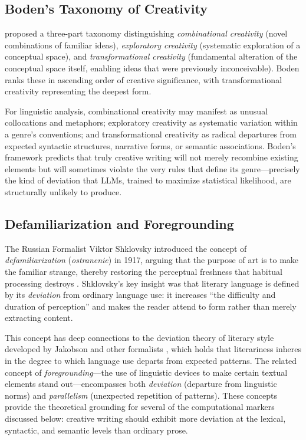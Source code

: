 \documentclass[12pt,a4paper]{article}
\begin{document}
\subsection{Boden's Taxonomy of Creativity}

\citet{boden2004creative, boden2009creativity} proposed a three-part taxonomy distinguishing \emph{combinational creativity} (novel combinations of familiar ideas), \emph{exploratory creativity} (systematic exploration of a conceptual space), and \emph{transformational creativity} (fundamental alteration of the conceptual space itself, enabling ideas that were previously inconceivable). Boden ranks these in ascending order of creative significance, with transformational creativity representing the deepest form.

For linguistic analysis, combinational creativity may manifest as unusual collocations and metaphors; exploratory creativity as systematic variation within a genre's conventions; and transformational creativity as radical departures from expected syntactic structures, narrative forms, or semantic associations. Boden's framework predicts that truly creative writing will not merely recombine existing elements but will sometimes violate the very rules that define its genre---precisely the kind of deviation that LLMs, trained to maximize statistical likelihood, are structurally unlikely to produce.

\subsection{Defamiliarization and Foregrounding}

The Russian Formalist Viktor Shklovsky introduced the concept of \emph{defamiliarization} (\emph{ostranenie}) in 1917, arguing that the purpose of art is to make the familiar strange, thereby restoring the perceptual freshness that habitual processing destroys \citep{shklovsky1917art}. Shklovsky's key insight was that literary language is defined by its \emph{deviation} from ordinary language use: it increases ``the difficulty and duration of perception'' and makes the reader attend to form rather than merely extracting content.

This concept has deep connections to the deviation theory of literary style developed by Jakobson and other formalists \citep{jakobson1960linguistics}, which holds that literariness inheres in the degree to which language use departs from expected patterns. The related concept of \emph{foregrounding}---the use of linguistic devices to make certain textual elements stand out---encompasses both \emph{deviation} (departure from linguistic norms) and \emph{parallelism} (unexpected repetition of patterns). These concepts provide the theoretical grounding for several of the computational markers discussed below: creative writing should exhibit more deviation at the lexical, syntactic, and semantic levels than ordinary prose.
\end{document}
